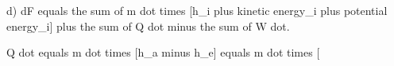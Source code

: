 d) dF equals the sum of m dot times [h_i plus kinetic energy_i plus potential energy_i] plus the sum of Q dot minus the sum of W dot.  

Q dot equals m dot times [h_a minus h_e] equals m dot times [